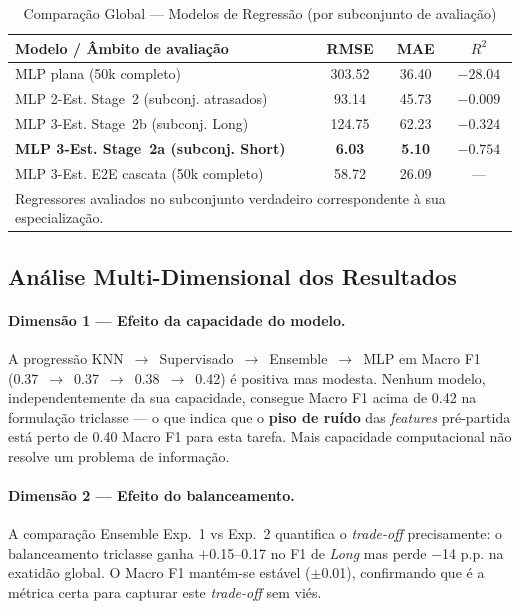 \documentclass[conference]{IEEEtran}
\begin{document}
\begin{table}[h]
\centering
\caption{Comparação Global — Modelos de Regressão (por subconjunto de avaliação)}
\label{tab:global_reg}
\setlength{\tabcolsep}{3pt}
\begin{tabular}{p{2.8cm}ccc}
\toprule
\textbf{Modelo / Âmbito de avaliação} & \textbf{RMSE} & \textbf{MAE} & \textbf{$R^2$} \\
\midrule
MLP plana (50k completo) & 303.52 & 36.40 & $-28.04$ \\
MLP 2-Est. Stage~2 (subconj. atrasados) & 93.14 & 45.73 & $-0.009$ \\
MLP 3-Est. Stage~2b (subconj. Long) & 124.75 & 62.23 & $-0.324$ \\
\textbf{MLP 3-Est. Stage~2a (subconj. Short)} & \textbf{6.03} & \textbf{5.10} & $-0.754$ \\
MLP 3-Est. E2E cascata (50k completo) & 58.72 & 26.09 & — \\
\bottomrule
\multicolumn{4}{l}{\small Regressores avaliados no subconjunto verdadeiro correspondente à sua especialização.}\\
\end{tabular}
\end{table}

\subsection{Análise Multi-Dimensional dos Resultados}

\paragraph{Dimensão 1 — Efeito da capacidade do modelo.}
A progressão KNN~$\to$~Supervisado~$\to$~Ensemble~$\to$~MLP em Macro F1
(0.37~$\to$~0.37~$\to$~0.38~$\to$~0.42) é positiva mas modesta. Nenhum modelo,
independentemente da sua capacidade, consegue Macro F1 acima de 0.42 na
formulação triclasse — o que indica que o \textbf{piso de ruído} das
\textit{features} pré-partida está perto de 0.40 Macro F1 para esta tarefa.
Mais capacidade computacional não resolve um problema de informação.

\paragraph{Dimensão 2 — Efeito do balanceamento.}
A comparação Ensemble Exp.~1 vs Exp.~2 quantifica o \textit{trade-off}
precisamente: o balanceamento triclasse ganha $+$0.15–0.17 no F1 de \textit{Long}
mas perde $-$14 p.p. na exatidão global. O Macro F1 mantém-se estável
($\pm$0.01), confirmando que é a métrica certa para capturar este
\textit{trade-off} sem viés.
\end{document}
